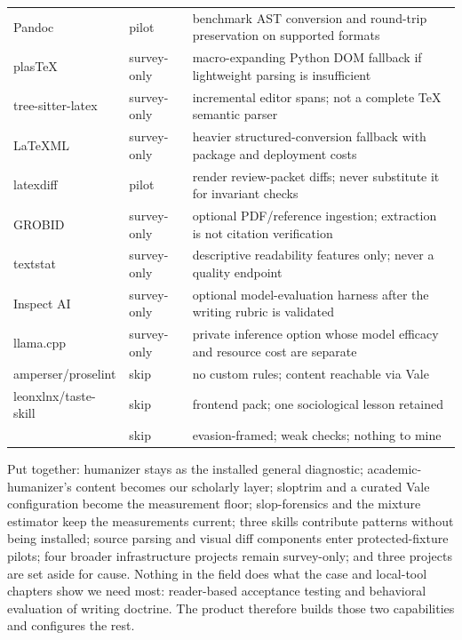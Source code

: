 \begin{longtable}{@{}>{\raggedright\arraybackslash}p{}
                     >{\raggedright\arraybackslash}p{}
                     >{\raggedright\arraybackslash}p{}@{}}
Pandoc & pilot & benchmark AST conversion and round-trip preservation on supported formats \\
plasTeX & survey-only & macro-expanding Python DOM fallback if lightweight parsing is insufficient \\
tree-sitter-latex & survey-only & incremental editor spans; not a complete TeX semantic parser \\
LaTeXML & survey-only & heavier structured-conversion fallback with package and deployment costs \\
latexdiff & pilot & render review-packet diffs; never substitute it for invariant checks \\
GROBID & survey-only & optional PDF/reference ingestion; extraction is not citation verification \\
textstat & survey-only & descriptive readability features only; never a quality endpoint \\
Inspect AI & survey-only & optional model-evaluation harness after the writing rubric is validated \\
llama.cpp & survey-only & private inference option whose model efficacy and resource cost are separate \\
amperser/proselint & skip & no custom rules; content reachable via Vale \\
leonxlnx/taste-skill & skip & frontend pack; one sociological lesson retained \\
{\scriptsize\path{itallstartedwithaidea/writing-agent}} & skip & evasion-framed; weak checks; nothing to mine \\
\end{longtable}
\endgroup

Put together: humanizer stays as the installed general diagnostic;
academic-humanizer's content becomes our scholarly layer; sloptrim and a
curated Vale configuration become the measurement floor; slop-forensics
and the mixture estimator keep the measurements current; three skills
contribute patterns without being installed; source parsing and visual diff
components enter protected-fixture pilots; four broader infrastructure
projects remain survey-only; and three projects are set aside for cause. Nothing in the field
does what the case and local-tool chapters show we need most: reader-based
acceptance testing and behavioral evaluation of writing doctrine. The product
therefore builds those two capabilities and configures the rest.
